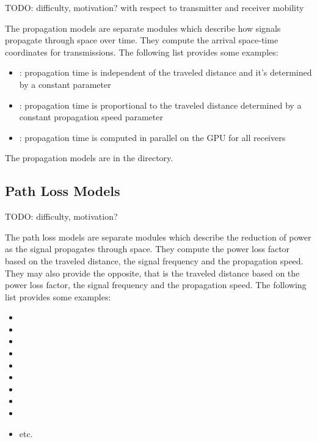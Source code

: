 TODO: difficulty, motivation? with respect to transmitter and receiver mobility

The propagation models are separate modules which describe how signals propagate
through space over time. They compute the arrival space-time coordinates for
transmissions. The following list provides some examples:

\begin{itemize}
  \item {}: propagation time is independent of
  the traveled distance and it's determined by a constant parameter
  \item {}: propagation time is proportional to
  the traveled distance determined by a constant propagation speed parameter
  \item {}: propagation time is computed in
  parallel on the GPU for all receivers
\end{itemize}

The propagation models are in the  directory.

\subsection{Path Loss Models}

TODO: difficulty, motivation?

The path loss models are separate modules which describe the reduction of power
as the signal propagates through space. They compute the power loss factor based
on the traveled distance, the signal frequency and the propagation speed. They
may also provide the opposite, that is the traveled distance based on the power
loss factor, the signal frequency and the propagation speed. The following list
provides some examples:

\begin{itemize}
  \item {}
  \item {}
  \item {}
  \item {}
  \item {}
  \item {}
  \item {}
  \item {}
  \item {}
  \item etc.
\end{itemize}

